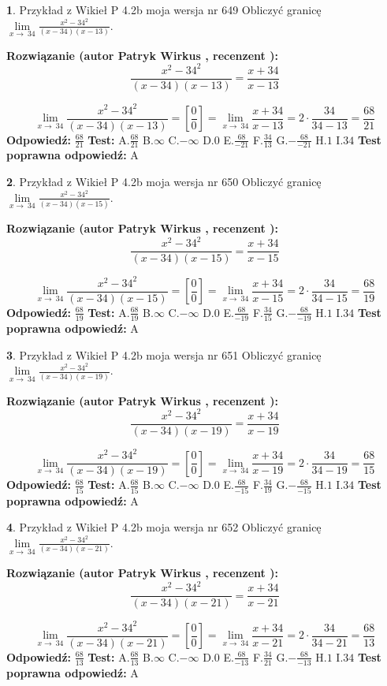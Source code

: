 \documentclass[12pt, a4paper]{article}
\theoremstyle{definition} %
\newtheorem{zad}{}
\newcommand{\zadStart}[1]{\begin{zad}#1\newline}
\newcommand{\zadStop}{\end{zad}}
\newcommand{\rozwStart}[2]{\noindent \textbf{Rozwiązanie (autor #1 , recenzent #2): }\newline}
\newcommand{\rozwStop}{\newline}
\newcommand{\odpStart}{\noindent \textbf{Odpowiedź:}\newline}
\newcommand{\odpStop}{\newline}
\newcommand{\testStart}{\noindent \textbf{Test:}\newline}
\newcommand{\testStop}{\newline}
\newcommand{\kluczStart}{\noindent \textbf{Test poprawna odpowiedź:}\newline}
\newcommand{\kluczStop}{\newline}
\begin{document}
\zadStart{Przykład z Wikieł P 4.2b moja wersja nr 649}
Obliczyć granicę $\lim\limits_{x\to\ 34}\frac{x^{2}-34^{2}}{(x-34)(x-13)}$.
\zadStop
\rozwStart{Patryk Wirkus}{}
$$\frac{x^{2}-34^{2}}{(x-34)(x-13)}=\frac{x+34}{x-13}$$

$$\lim\limits_{x\to\ 34}\frac{x^{2}-34^{2}}{(x-34)(x-13)}=[\frac{0}{0}]=\lim\limits_{x\to\ 34}\frac{x+34}{x-13}=2 \cdot \frac{34}{34-13} = \frac{68}{21}$$
\rozwStop
\odpStart
$\frac{68}{21}$
\odpStop
\testStart
A.$\frac{68}{21}$
B.$\infty$
C.$-\infty$
D.$0$
E.$\frac{68}{-21}$
F.$\frac{34}{13}$
G.$-\frac{68}{-21}$
H.$1$
I.$34$
\testStop
\kluczStart
A
\kluczStop



\zadStart{Przykład z Wikieł P 4.2b moja wersja nr 650}
Obliczyć granicę $\lim\limits_{x\to\ 34}\frac{x^{2}-34^{2}}{(x-34)(x-15)}$.
\zadStop
\rozwStart{Patryk Wirkus}{}
$$\frac{x^{2}-34^{2}}{(x-34)(x-15)}=\frac{x+34}{x-15}$$

$$\lim\limits_{x\to\ 34}\frac{x^{2}-34^{2}}{(x-34)(x-15)}=[\frac{0}{0}]=\lim\limits_{x\to\ 34}\frac{x+34}{x-15}=2 \cdot \frac{34}{34-15} = \frac{68}{19}$$
\rozwStop
\odpStart
$\frac{68}{19}$
\odpStop
\testStart
A.$\frac{68}{19}$
B.$\infty$
C.$-\infty$
D.$0$
E.$\frac{68}{-19}$
F.$\frac{34}{15}$
G.$-\frac{68}{-19}$
H.$1$
I.$34$
\testStop
\kluczStart
A
\kluczStop



\zadStart{Przykład z Wikieł P 4.2b moja wersja nr 651}
Obliczyć granicę $\lim\limits_{x\to\ 34}\frac{x^{2}-34^{2}}{(x-34)(x-19)}$.
\zadStop
\rozwStart{Patryk Wirkus}{}
$$\frac{x^{2}-34^{2}}{(x-34)(x-19)}=\frac{x+34}{x-19}$$

$$\lim\limits_{x\to\ 34}\frac{x^{2}-34^{2}}{(x-34)(x-19)}=[\frac{0}{0}]=\lim\limits_{x\to\ 34}\frac{x+34}{x-19}=2 \cdot \frac{34}{34-19} = \frac{68}{15}$$
\rozwStop
\odpStart
$\frac{68}{15}$
\odpStop
\testStart
A.$\frac{68}{15}$
B.$\infty$
C.$-\infty$
D.$0$
E.$\frac{68}{-15}$
F.$\frac{34}{19}$
G.$-\frac{68}{-15}$
H.$1$
I.$34$
\testStop
\kluczStart
A
\kluczStop



\zadStart{Przykład z Wikieł P 4.2b moja wersja nr 652}
Obliczyć granicę $\lim\limits_{x\to\ 34}\frac{x^{2}-34^{2}}{(x-34)(x-21)}$.
\zadStop
\rozwStart{Patryk Wirkus}{}
$$\frac{x^{2}-34^{2}}{(x-34)(x-21)}=\frac{x+34}{x-21}$$

$$\lim\limits_{x\to\ 34}\frac{x^{2}-34^{2}}{(x-34)(x-21)}=[\frac{0}{0}]=\lim\limits_{x\to\ 34}\frac{x+34}{x-21}=2 \cdot \frac{34}{34-21} = \frac{68}{13}$$
\rozwStop
\odpStart
$\frac{68}{13}$
\odpStop
\testStart
A.$\frac{68}{13}$
B.$\infty$
C.$-\infty$
D.$0$
E.$\frac{68}{-13}$
F.$\frac{34}{21}$
G.$-\frac{68}{-13}$
H.$1$
I.$34$
\testStop
\kluczStart
A
\kluczStop
\end{document}

